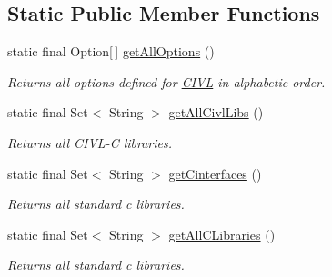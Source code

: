 \subsection*{Static Public Member Functions}
\begin{DoxyCompactItemize}
\item 
static final Option\mbox{[}$\,$\mbox{]} \hyperlink{classedu_1_1udel_1_1cis_1_1vsl_1_1civl_1_1config_1_1IF_1_1CIVLConstants_a6a163ad0818f14765e1eb6440e2d2507}{get\+All\+Options} ()
\begin{DoxyCompactList}\small\item\em Returns all options defined for \hyperlink{classedu_1_1udel_1_1cis_1_1vsl_1_1civl_1_1CIVL}{C\+I\+V\+L} in alphabetic order. \end{DoxyCompactList}\item 
static final Set$<$ String $>$ \hyperlink{classedu_1_1udel_1_1cis_1_1vsl_1_1civl_1_1config_1_1IF_1_1CIVLConstants_abc337c45c632bac4e6d0a31e36a24f1e}{get\+All\+Civl\+Libs} ()
\begin{DoxyCompactList}\small\item\em Returns all C\+I\+V\+L-\/\+C libraries. \end{DoxyCompactList}\item 
static final Set$<$ String $>$ \hyperlink{classedu_1_1udel_1_1cis_1_1vsl_1_1civl_1_1config_1_1IF_1_1CIVLConstants_a6832fa293041c7408040fa91b99aaf8d}{get\+Cinterfaces} ()
\begin{DoxyCompactList}\small\item\em Returns all standard c libraries. \end{DoxyCompactList}\item 
static final Set$<$ String $>$ \hyperlink{classedu_1_1udel_1_1cis_1_1vsl_1_1civl_1_1config_1_1IF_1_1CIVLConstants_a46810e54c5c25828fbbc48e41cb1ec97}{get\+All\+C\+Libraries} ()
\begin{DoxyCompactList}\small\item\em Returns all standard c libraries. \end{DoxyCompactList}\end{DoxyCompactItemize}
